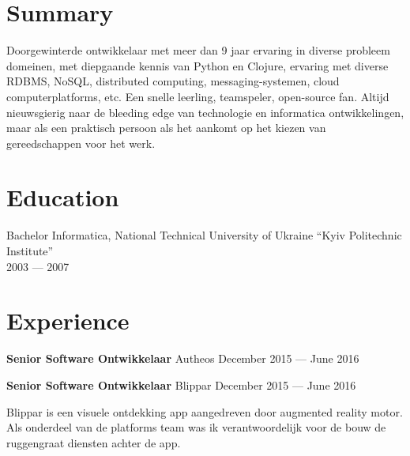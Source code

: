 \documentclass[margin]{res}
\begin{document}

\address{{\bf Mailing address} \\ Czaar Peterstraat 103B \\ 1018PE, Amsterdam \\ The Netherlands}

\address{{\bf Contacts} \\ +31 62 980 61 41 \\ contact@mishkovskyi.net \\ \href{https://github.com/mishok13}{mishok13@GitHub}}

\begin{resume}

\section{Summary}
Doorgewinterde ontwikkelaar met meer dan 9 jaar ervaring in diverse
probleem domeinen, met diepgaande kennis van Python en Clojure,
ervaring met diverse RDBMS, NoSQL, distributed computing,
messaging-systemen, cloud computerplatforms, etc. Een snelle leerling,
teamspeler, open-source fan. Altijd nieuwsgierig naar de bleeding edge
van technologie en informatica ontwikkelingen, maar als een praktisch
persoon als het aankomt op het kiezen van gereedschappen voor het
werk.

\section{Education}
Bachelor Informatica, National Technical University of Ukraine ``Kyiv Politechnic Institute'' \\
2003 --- 2007

\section{Experience}

{\bf Senior Software Ontwikkelaar} Autheos \hfill December 2015 --- June 2016



{\bf Senior Software Ontwikkelaar} Blippar \hfill December 2015 --- June 2016

Blippar is een visuele ontdekking app aangedreven door augmented reality
motor. Als onderdeel van de platforms team was ik verantwoordelijk voor de bouw
de ruggengraat diensten achter de app.


\end{resume}
\end{document}

